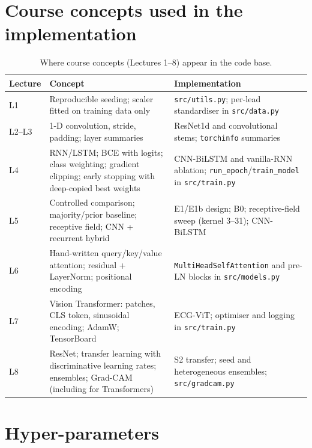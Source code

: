 \section{Course concepts used in the implementation}
\label{app:course}

\begin{table}[H]
\centering
\small
\caption{Where course concepts (Lectures 1--8) appear in the code base.}
\begin{tabular}{p{1.4cm}p{6.6cm}p{6.4cm}}
\toprule
Lecture & Concept & Implementation \\
\midrule
L1 & Reproducible seeding; scaler fitted on training data only & \texttt{src/utils.py}; per-lead standardiser in \texttt{src/data.py} \\
L2--L3 & 1-D convolution, stride, padding; layer summaries & ResNet1d and convolutional stems; \texttt{torchinfo} summaries \\
L4 & RNN/LSTM; BCE with logits; class weighting; gradient clipping; early stopping with deep-copied best weights & CNN-BiLSTM and vanilla-RNN ablation; \texttt{run\_epoch}/\texttt{train\_model} in \texttt{src/train.py} \\
L5 & Controlled comparison; majority/prior baseline; receptive field; CNN + recurrent hybrid & E1/E1b design; B0; receptive-field sweep (kernel 3--31); CNN-BiLSTM \\
L6 & Hand-written query/key/value attention; residual + LayerNorm; positional encoding & \texttt{MultiHeadSelfAttention} and pre-LN blocks in \texttt{src/models.py} \\
L7 & Vision Transformer: patches, CLS token, sinusoidal encoding; AdamW; TensorBoard & ECG-ViT; optimiser and logging in \texttt{src/train.py} \\
L8 & ResNet; transfer learning with discriminative learning rates; ensembles; Grad-CAM (including for Transformers) & S2 transfer; seed and heterogeneous ensembles; \texttt{src/gradcam.py} \\
\bottomrule
\end{tabular}
\end{table}

\section{Hyper-parameters}
\label{app:hparams}

